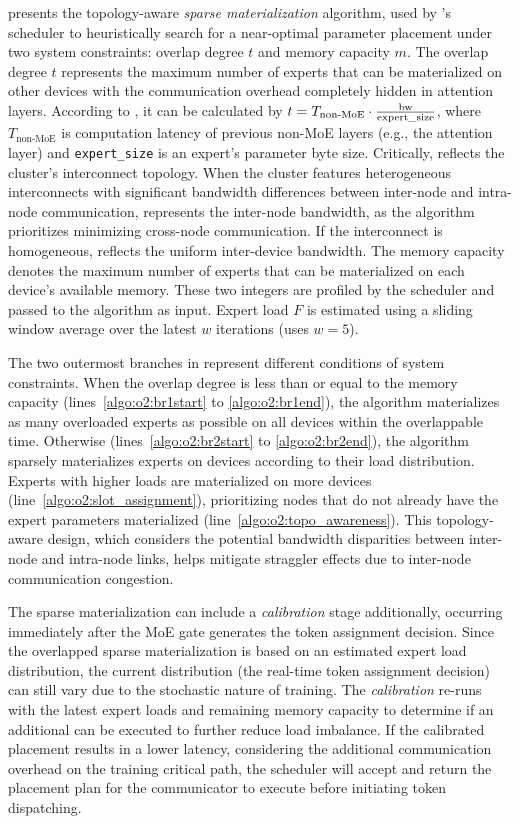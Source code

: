  presents the topology-aware \textit{sparse materialization} algorithm, used by \xxx's scheduler to heuristically search for a near-optimal parameter placement under two system constraints: overlap degree $t$ and memory capacity $m$.
The overlap degree $t$ represents the maximum number of experts that can be materialized on other devices with the communication overhead completely hidden in attention layers. 
According to , it can be calculated by $t = T_\text{non-MoE} \cdot \frac{\text{bw}}{\text{expert\_size}}$, where $T_\text{non-MoE}$ is computation latency of previous non-MoE layers (e.g., the attention layer) and \texttt{expert\_size} is an expert's parameter byte size.
Critically, \texttt{\bw} reflects the cluster's interconnect topology.
When the cluster features heterogeneous interconnects with significant bandwidth differences between inter-node and intra-node communication, \texttt{\bw} represents the inter-node bandwidth, as the algorithm prioritizes minimizing cross-node communication.
If the interconnect is homogeneous, \texttt{\bw} reflects the uniform inter-device bandwidth.
The memory capacity denotes the maximum number of experts that can be materialized on each device's available memory. 
These two integers are profiled by the scheduler and passed to the algorithm as input. 
Expert load $F$ is estimated using a sliding window average over the latest $w$ iterations (\xxx uses $w=5$).

The two outermost branches in  represent different conditions of system constraints. 
When the overlap degree is less than or equal to the memory capacity (lines~\ref{algo:o2:br1start} to \ref{algo:o2:br1end}), the algorithm materializes as many overloaded experts as possible on all devices within the overlappable time. 
Otherwise
(lines~\ref{algo:o2:br2start} to \ref{algo:o2:br2end}), the algorithm sparsely materializes experts on devices according to their load distribution. Experts with higher loads are materialized on more devices (line~\ref{algo:o2:slot_assignment}), prioritizing nodes that do not already have the expert parameters materialized (line~\ref{algo:o2:topo_awareness}).
This topology-aware design, which considers the potential bandwidth disparities between inter-node and intra-node links, helps mitigate \collatoa straggler effects due to inter-node communication congestion.

The sparse materialization can include a \textit{calibration} stage additionally, occurring immediately after the MoE gate generates the token assignment decision. Since the overlapped sparse materialization is based on an estimated expert load distribution, the current distribution (\ie the real-time token assignment decision) can still vary due to the stochastic nature of training. The \textit{calibration} re-runs  with the latest expert loads and remaining memory capacity to determine if an additional \collsag can be executed to further reduce load imbalance. If the calibrated placement results in a lower latency, considering the additional communication overhead on the training critical path, the scheduler will accept and return the placement plan for the communicator to execute before initiating token dispatching.

